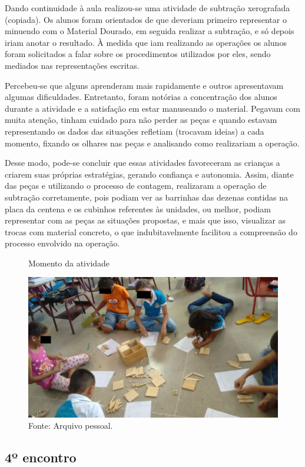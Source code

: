 \begin{refsection}
    Dando continuidade à aula realizou-se uma atividade de subtração xerografada (copiada). Os alunos foram orientados de que deveriam primeiro representar o minuendo com o Material Dourado, em seguida realizar a subtração, e só depois  iriam  anotar  o resultado. À medida que iam realizando as operações os alunos foram solicitados a falar sobre os procedimentos utilizados por eles, sendo mediados nas representações escritas.  

    Percebeu-se que alguns aprenderam mais rapidamente e outros apresentavam algumas dificuldades. Entretanto, foram notórias a concentração dos alunos durante a atividade e a satisfação em estar manuseando o material. Pegavam com muita atenção, tinham cuidado para não perder as peças e quando estavam representando os dados das situações refletiam (trocavam ideias) a cada momento, fixando os olhares nas peças e analisando como realizariam a operação.  

    Desse modo, pode-se concluir que essas atividades favoreceram as crianças a criarem suas próprias estratégias, gerando confiança e autonomia. Assim, diante das peças e utilizando o processo de contagem, realizaram a operação de subtração corretamente, pois podiam ver as barrinhas das dezenas contidas na placa da centena e os cubinhos referentes às unidades, ou melhor, podiam representar com as peças as situações propostas, e mais que isso, visualizar as trocas com material concreto, o que indubitavelmente facilitou a compreensão do processo envolvido na operação.

    \begin{figure}[ht]%
        \centering%
        \caption{Momento da atividade}%
        \includegraphics[width=.5\textwidth]{articles/05-material-dourado-com/figura6.jpeg}%
        \caption*{Fonte: Arquivo pessoal.}%
        \label{fig:momento-atividade}%
    \end{figure}%

    \subsection{4º encontro}


\end{refsection}
